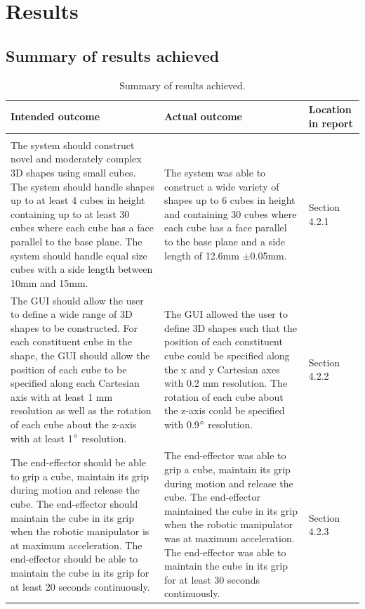 
\section{Results}

\subsection{Summary of results achieved}

\begin{table}[H]
	\renewcommand{\arraystretch}{1.3}
	\centering
	\begin{tabular}{|>{\raggedright}m{6cm}|>{\raggedright}m{6cm}|>{\raggedright\arraybackslash}m{2.2cm}|}
		\hline
		\textbf{Intended outcome} & \textbf{Actual outcome} & \textbf{Location in report} \\
		\hline
		\multicolumn{3}{|l|}{\textbf{Core mission requirements and specifications}} \\
		\hline
		The system should construct novel and moderately complex 3D shapes using small cubes. The system should handle shapes up to at least 4 cubes in height containing up to at least 30 cubes where each cube has a face parallel to the base plane. The system should handle equal size cubes with a side length between 10mm and 15mm. & The system was able to construct a wide variety of shapes up to 6 cubes in height and containing 30 cubes where each cube has a face parallel to the base plane and a side length of 12.6mm $\pm$0.05mm. & Section 4.2.1 \\
		\hline
		The GUI should allow the user to define a wide range of 3D shapes to be constructed. For each constituent cube in the shape, the GUI should allow the position of each cube to be specified along each Cartesian axis with at least 1 mm resolution as well as the rotation of each cube about the z-axis with at least 1$^{\circ}$ resolution. & The GUI allowed the user to define 3D shapes such that the position of each constituent cube could be specified along the x and y Cartesian axes with 0.2 mm resolution. The rotation of each cube about the z-axis could be specified with 0.9$^{\circ}$ resolution. & Section 4.2.2 \\
		\hline
		The end-effector should be able to grip a cube, maintain its grip during motion and release the cube. The end-effector should maintain the cube in its grip when the robotic manipulator is at maximum acceleration. The end-effector should be able to maintain the cube in its grip for at least 20 seconds continuously. & The end-effector was able to grip a cube, maintain its grip during motion and release the cube. The end-effector maintained the cube in its grip when the robotic manipulator was at maximum acceleration. The end-effector was able to maintain the cube in its grip for at least 30 seconds continuously.  & Section 4.2.3 \\
		\hline
	\end{tabular}
	\caption{\label{tab:results_summary_p1}Summary of results achieved.}
\end{table}

